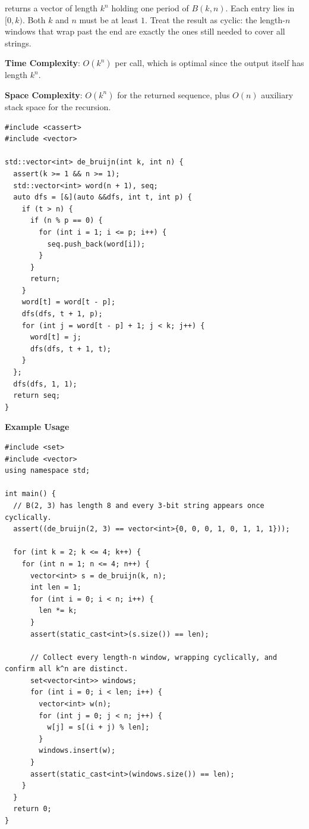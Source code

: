 \begin{compactitem}
  \item {} returns a vector of length $k^n$ holding one period of $B(k, n)$. Each entry lies in $[0, k)$. Both $k$ and $n$ must be at least $1$. Treat the result as cyclic: the length-$n$ windows that wrap past the end are exactly the ones still needed to cover all strings.
\end{compactitem}

\textbf{Time Complexity}: $O(k^{n})$ per call, which is optimal since the output itself has length $k^n$.

\textbf{Space Complexity}: $O(k^{n})$ for the returned sequence, plus $O(n)$ auxiliary stack space for the recursion.

\begin{lstlisting}[style=cpp]
#include <cassert>
#include <vector>

std::vector<int> de_bruijn(int k, int n) {
  assert(k >= 1 && n >= 1);
  std::vector<int> word(n + 1), seq;
  auto dfs = [&](auto &&dfs, int t, int p) {
    if (t > n) {
      if (n % p == 0) {
        for (int i = 1; i <= p; i++) {
          seq.push_back(word[i]);
        }
      }
      return;
    }
    word[t] = word[t - p];
    dfs(dfs, t + 1, p);
    for (int j = word[t - p] + 1; j < k; j++) {
      word[t] = j;
      dfs(dfs, t + 1, t);
    }
  };
  dfs(dfs, 1, 1);
  return seq;
}
\end{lstlisting}
\textbf{Example Usage}\par
\begin{lstlisting}[style=cpp]
#include <set>
#include <vector>
using namespace std;

int main() {
  // B(2, 3) has length 8 and every 3-bit string appears once cyclically.
  assert((de_bruijn(2, 3) == vector<int>{0, 0, 0, 1, 0, 1, 1, 1}));

  for (int k = 2; k <= 4; k++) {
    for (int n = 1; n <= 4; n++) {
      vector<int> s = de_bruijn(k, n);
      int len = 1;
      for (int i = 0; i < n; i++) {
        len *= k;
      }
      assert(static_cast<int>(s.size()) == len);

      // Collect every length-n window, wrapping cyclically, and confirm all k^n are distinct.
      set<vector<int>> windows;
      for (int i = 0; i < len; i++) {
        vector<int> w(n);
        for (int j = 0; j < n; j++) {
          w[j] = s[(i + j) % len];
        }
        windows.insert(w);
      }
      assert(static_cast<int>(windows.size()) == len);
    }
  }
  return 0;
}
\end{lstlisting}

